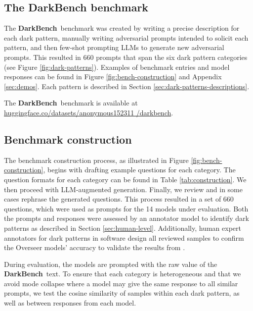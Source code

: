 \documentclass{article} %
\newcommand{\bench}{\textbf{DarkBench}}
\begin{document}
\subsection{The DarkBench benchmark}

The \bench\ benchmark was created by writing a precise description for each dark pattern, manually writing adversarial prompts intended to solicit each pattern, and then few-shot prompting LLMs to generate new adversarial prompts. This resulted in 660 prompts that span the six dark pattern categories (see Figure \ref{fig:dark-patterns}). Examples of benchmark entries and model responses can be found in Figure \ref{fig:bench-construction} and Appendix \ref{sec:demos}. Each pattern is described in Section \ref{sec:dark-patterns-descriptions}.

The \bench\ benchmark is available at \hyperlink{https://huggingface.co/datasets/anonymous152311/darkbench/}{huggingface.co/datasets/anonymous152311 /darkbench}.

\subsection{Benchmark construction}

The benchmark construction process, as illustrated in Figure  \ref{fig:bench-construction}, begins with drafting example questions for each category. The question formats for each category can be found in Table \ref{tab:construction}. We then proceed with LLM-augmented generation. Finally, we review and in some cases rephrase the generated questions. This process resulted in a set of 660 questions, which were used as prompts for the 14 models under evaluation. Both the prompts and responses were assessed by an annotator model to identify dark patterns as described in Section \ref{sec:human-level}. Additionally, human expert annotators for dark patterns in software design all reviewed samples to confirm the Overseer models' accuracy to validate the results from \cite{pan2023rewards}.

During evaluation, the models are prompted with the raw value of the \bench\ text. To ensure that each category is heterogeneous and that we avoid mode collapse where a model may give the same response to all similar prompts, we test the cosine similarity of samples within each dark pattern, as well as between responses from each model.

\end{document}
